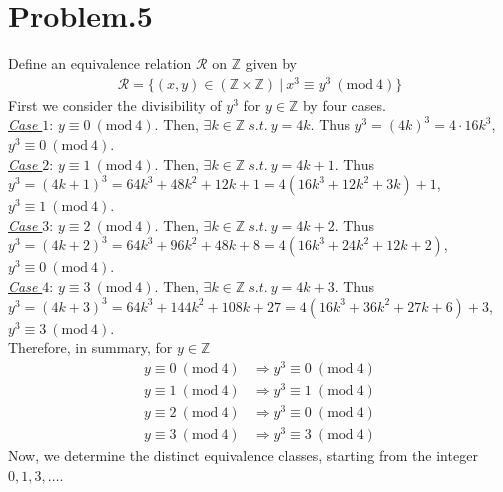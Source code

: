 \documentclass[12pt]{article}
\begin{document}
\section*{Problem.5}
Define an equivalence relation $\mathcal{R}$ on $\mathbb{Z}$ given by
\begin{gather*}
\mathcal{R} = \{ (x,y) \in (\mathbb{Z} \times \mathbb{Z}) ~|~ x^3 \equiv y^3 ~\left(\mathrm{mod}~4\right) \}
\end{gather*}
First we consider the divisibility of $y^3$ for $y \in \mathbb{Z}$ by four cases.\\
\underline{\textit{Case $1$}}: $y \equiv 0 ~\left(\mathrm{mod}~4\right)$. Then, $\exists k \in \mathbb{Z} ~s.t.~ y = 4k$. Thus $y^3 = \left(4k\right)^3 = 4 \cdot 16 k^3$, $y^3 \equiv 0 ~\left(\mathrm{mod}~4\right)$. \\[1em]
\underline{\textit{Case $2$}}: $y \equiv 1 ~\left(\mathrm{mod}~4\right)$. Then, $\exists k \in \mathbb{Z} ~s.t.~ y = 4k + 1$. Thus $y^3 = \left(4k + 1\right)^3 = 64 k^3 + 48 k^2 + 12 k + 1 = 4 \left( 16 k^3 + 12 k^2 + 3 k \right) + 1$, $y^3 \equiv 1 ~\left(\mathrm{mod}~4\right)$. \\[1em]
\underline{\textit{Case $3$}}: $y \equiv 2 ~\left(\mathrm{mod}~4\right)$. Then, $\exists k \in \mathbb{Z} ~s.t.~ y = 4k + 2$. Thus $y^3 = \left(4k + 2\right)^3 = 64 k^3 + 96 k^2 + 48 k + 8 = 4 \left( 16 k^3 + 24 k^2 + 12 k + 2\right)$, $y^3 \equiv 0 ~\left(\mathrm{mod}~4\right)$. \\[1em]
\underline{\textit{Case $4$}}: $y \equiv 3 ~\left(\mathrm{mod}~4\right)$. Then, $\exists k \in \mathbb{Z} ~s.t.~ y = 4k + 3$. Thus $y^3 = \left(4k + 3\right)^3 = 64 k^3 + 144 k^2 + 108 k + 27 = 4 \left( 16 k^3 + 36 k^2 + 27 k + 6\right) + 3$, $y^3 \equiv 3 ~\left(\mathrm{mod}~4\right)$. \\[1em]
Therefore, in summary, for $y \in \mathbb{Z}$
\begin{align*}
y \equiv 0 ~\left(\mathrm{mod}~4\right) &\Rightarrow y^3 \equiv 0 ~\left(\mathrm{mod}~4\right)\\[1em]
y \equiv 1 ~\left(\mathrm{mod}~4\right) &\Rightarrow y^3 \equiv 1 ~\left(\mathrm{mod}~4\right)\\[1em]
y \equiv 2 ~\left(\mathrm{mod}~4\right) &\Rightarrow y^3 \equiv 0 ~\left(\mathrm{mod}~4\right)\\[1em]
y \equiv 3 ~\left(\mathrm{mod}~4\right) &\Rightarrow y^3 \equiv 3 ~\left(\mathrm{mod}~4\right)
\end{align*}
Now, we determine the distinct equivalence classes, starting from the integer $0,1,3,\dots$.
\end{document}
